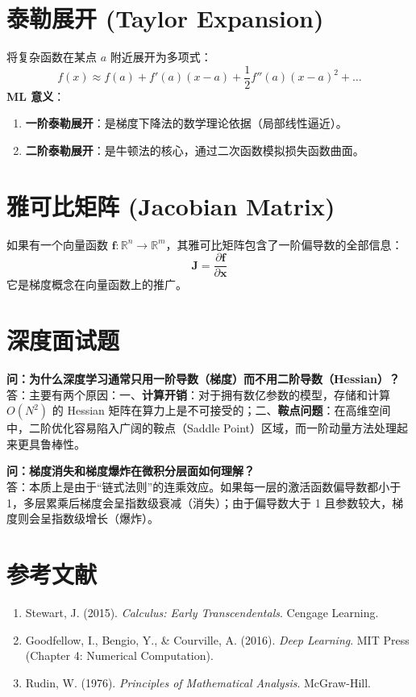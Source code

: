 \documentclass[12pt, a4paper]{article}
\begin{document}
\section{泰勒展开 (Taylor Expansion)}
将复杂函数在某点 $a$ 附近展开为多项式：
$$ f(x) \approx f(a) + f'(a)(x-a) + \frac{1}{2}f''(a)(x-a)^2 + \dots $$
\textbf{ML 意义}：
\begin{enumerate}
    \item \textbf{一阶泰勒展开}：是梯度下降法的数学理论依据（局部线性逼近）。
    \item \textbf{二阶泰勒展开}：是牛顿法的核心，通过二次函数模拟损失函数曲面。
\end{enumerate}

\section{雅可比矩阵 (Jacobian Matrix)}
如果有一个向量函数 $\mathbf{f}: \mathbb{R}^n \to \mathbb{R}^m$，其雅可比矩阵包含了一阶偏导数的全部信息：
$$ \mathbf{J} = \frac{\partial \mathbf{f}}{\partial \mathbf{x}} $$
它是梯度概念在向量函数上的推广。

\section{深度面试题}

\textbf{问：为什么深度学习通常只用一阶导数（梯度）而不用二阶导数（Hessian）？}\\
答：主要有两个原因：一、\textbf{计算开销}：对于拥有数亿参数的模型，存储和计算 $O(N^2)$ 的 Hessian 矩阵在算力上是不可接受的；二、\textbf{鞍点问题}：在高维空间中，二阶优化容易陷入广阔的鞍点（Saddle Point）区域，而一阶动量方法处理起来更具鲁棒性。

\textbf{问：梯度消失和梯度爆炸在微积分层面如何理解？}\\
答：本质上是由于“链式法则”的连乘效应。如果每一层的激活函数偏导数都小于 1，多层累乘后梯度会呈指数级衰减（消失）；由于偏导数大于 1 且参数较大，梯度则会呈指数级增长（爆炸）。

\section{参考文献}
\begin{enumerate}
    \item Stewart, J. (2015). \textit{Calculus: Early Transcendentals}. Cengage Learning.
    \item Goodfellow, I., Bengio, Y., \& Courville, A. (2016). \textit{Deep Learning}. MIT Press (Chapter 4: Numerical Computation).
    \item Rudin, W. (1976). \textit{Principles of Mathematical Analysis}. McGraw-Hill.
\end{enumerate}
\end{document}
